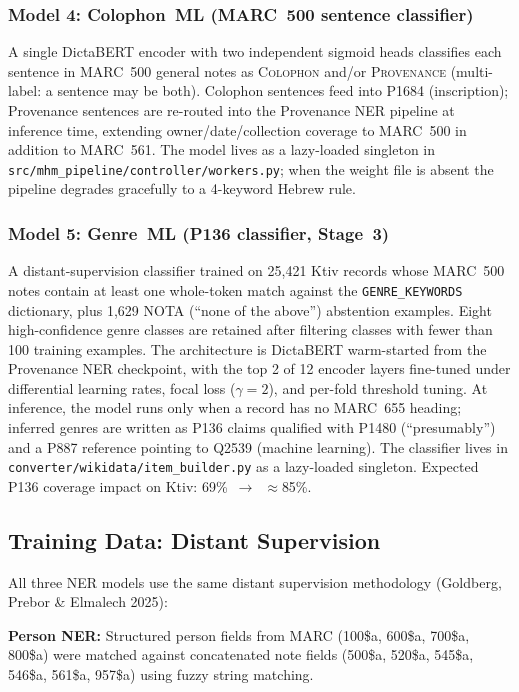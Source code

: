 \documentclass[12pt]{article}
\newcommand{\code}[1]{\texttt{#1}}
\begin{document}
\subsubsection{Model 4: Colophon~ML (MARC~500 sentence classifier)}

A single DictaBERT encoder with two independent sigmoid heads classifies each sentence in MARC~500 general notes as \textsc{Colophon} and/or \textsc{Provenance} (multi-label: a sentence may be both). Colophon sentences feed into P1684 (inscription); Provenance sentences are re-routed into the Provenance NER pipeline at inference time, extending owner/date/collection coverage to MARC~500 in addition to MARC~561. The model lives as a lazy-loaded singleton in \code{src/mhm\_pipeline/controller/workers.py}; when the weight file is absent the pipeline degrades gracefully to a 4-keyword Hebrew rule.

\subsubsection{Model 5: Genre~ML (P136 classifier, Stage~3)}

A distant-supervision classifier trained on 25,421 Ktiv records whose MARC~500 notes contain at least one whole-token match against the \texttt{GENRE\_KEYWORDS} dictionary, plus 1{,}629 NOTA (``none of the above'') abstention examples. Eight high-confidence genre classes are retained after filtering classes with fewer than 100 training examples. The architecture is DictaBERT warm-started from the Provenance NER checkpoint, with the top 2 of 12 encoder layers fine-tuned under differential learning rates, focal loss ($\gamma=2$), and per-fold threshold tuning. At inference, the model runs only when a record has no MARC~655 heading; inferred genres are written as P136 claims qualified with P1480 (``presumably'') and a P887 reference pointing to Q2539 (machine learning). The classifier lives in \code{converter/wikidata/item\_builder.py} as a lazy-loaded singleton. Expected P136 coverage impact on Ktiv: 69\%~$\to$~$\approx$85\%.

\subsection{Training Data: Distant Supervision}

All three NER models use the same distant supervision methodology (Goldberg, Prebor \& Elmalech 2025):

\textbf{Person NER:} Structured person fields from MARC (100\$a, 600\$a, 700\$a, 800\$a) were matched against concatenated note fields (500\$a, 520\$a, 545\$a, 546\$a, 561\$a, 957\$a) using fuzzy string matching.
\end{document}
